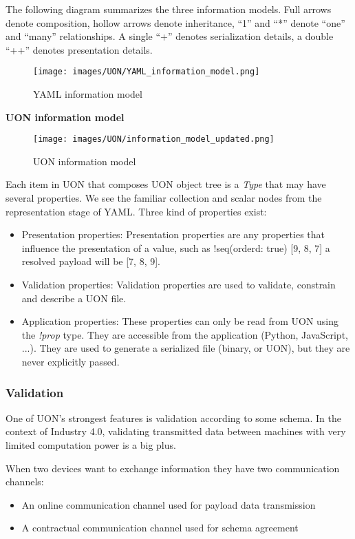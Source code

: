 \documentclass[12pt]{article}
\begin{document}
The following diagram summarizes the three information models. Full arrows denote composition, hollow arrows denote inheritance, “1” and “*” denote “one” and “many” relationships. A single “+” denotes serialization details, a double “++” denotes presentation details. 
\begin{figure}[ht!]
 	\centering
 	\caption{YAML information model}
 	\texttt{[image: images/UON/YAML\_information\_model.png]}
 	\label{lab:perceptron}
\end{figure}

\textbf{UON information model}

\begin{figure}[ht!]
 	\centering
 	\caption{UON information model}
 	\texttt{[image: images/UON/information\_model\_updated.png]}
 	\label{fig:UON information model}
\end{figure}

Each item in UON that composes UON object tree is a \emph{Type} that may have several properties. 
We see the familiar collection and scalar nodes from the representation stage of YAML.
Three kind of properties exist:
\begin{itemize}
    \item Presentation properties: Presentation properties are any properties that influence the presentation of a value, such as !seq(orderd: true) [9, 8, 7] a resolved payload will be [7, 8, 9].
    \item Validation properties: Validation properties are used to validate, constrain and describe a UON file.
    \item Application properties: These properties can only be read from UON using the \emph{!prop} type. They are accessible from the application (Python, JavaScript, ...). They are used to generate a serialized file (binary, or UON), but they are never explicitly passed.
\end{itemize}

\subsubsection{Validation}
One of UON’s strongest features is validation according to some schema. In the context of Industry 4.0, validating transmitted data between machines with very limited computation power is a big plus. 

When two devices want to exchange information they have two communication channels:
\begin{itemize}
    \item An online communication channel used for payload data transmission
    \item A contractual communication channel used for schema agreement
\end{itemize}
\end{document}
